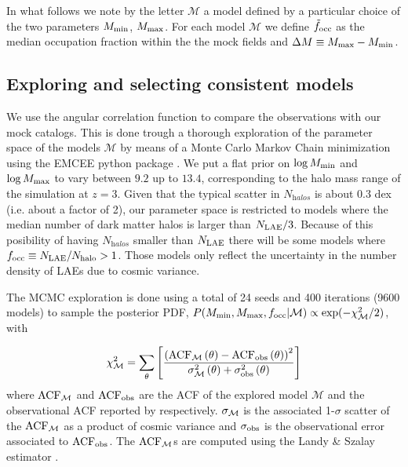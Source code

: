 \documentclass{emulateapj}
\newcommand{\mmin}{{\ifmmode{{M_{\rm min}}}\else{${M_{\rm min}}$}\fi}}
\newcommand{\mmax}{{\ifmmode{{M_{\rm max}}}\else{${M_{\rm max}}$}\fi}}
\newcommand{\focc}{{\ifmmode{{f_{\rm occ}}}\else{${f_{\rm occ}}$}\fi}}
\begin{document}
In what follows we note by the letter ${\mathcal M}$ a model
defined by a particular choice of the two parameters $M_{\rm min}$, 
$M_{\rm  max}$. For each model  ${\mathcal M}$ we define $\tilde{f}_{\rm occ}$ as the median occupation fraction within the the mock fields and  $\Delta M \equiv \mmax-\mmin$.

\subsection{Exploring and selecting consistent models}
\label{subsec:explore}
We use the angular correlation function to compare the observations with our mock catalogs. 
This is done trough a thorough exploration of the parameter space of the models ${\mathcal M}$ by  means of a Monte Carlo Markov Chain minimization using  the EMCEE python package \citep{emcee2013}.
We put a flat prior on $\log M_{\rm min}$ and $\log \mmax$ to vary between $9.2$ up to $13.4$, corresponding to the halo mass range of the simulation at $z=3$. 
Given that the typical scatter  in $N_{\mathrm halos}$ is about 0.3 dex (i.e. about  a factor of 2), our parameter space is restricted to models where the median number of dark matter halos is larger than  $N_{\rm LAE}/3$. Because of this posibility of having $N_{\mathrm halos}$  smaller than $N_{\rm LAE}$ there will be some models where    $\focc\equiv N_{\rm LAE}/N_{\rm halo}>1$. Those models only reflect the uncertainty in the number density of LAEs due to cosmic variance.


The MCMC exploration is done using a total of 24 seeds and 400
iterations (9600 models) to sample the posterior PDF,  $P(\mmin,
\mmax, f_{\rm occ}| \mathcal{M}) \propto \exp(-\chi_{\mathcal
  M}^2/2)$, with 

\begin{equation}
\chi_{\mathcal M}^2=\sum_{\theta}\left[\frac{\left( \rm{ACF}_{\mathcal M}\left(\theta\right) - \rm{ACF}_{\rm obs}\left(\theta\right)\right)^2}{ \sigma_{\rm \mathcal M}^{2}\left(\theta\right) + \sigma_{\rm obs}^{2}\left(\theta\right)}\right]
\end{equation}
%
where  $\rm{ACF}_{\mathcal M}$ and  $\rm{ACF}_{\rm obs}$ are the ACF
of the explored model ${\mathcal M}$ and the observational ACF
reported by \citet{Bielby16} respectively. $\sigma_{\rm \mathcal M}$
is the associated 1-$\sigma$ scatter  of the $\rm{ACF}_{\mathcal M}$
as a product of cosmic variance and  $\sigma_{\rm obs}$ is the
observational error associated to $\rm{ACF}_{\rm obs}$.  The
$\rm{ACF}_{\mathcal M}$s are computed using the Landy \&  Szalay
estimator  \citep{Landy1993}.  
\end{document}
